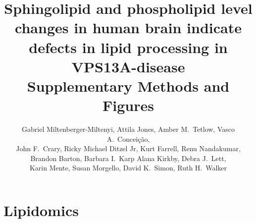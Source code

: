 \documentclass[letterpaper]{article}
\begin{document}
\title{Sphingolipid and phospholipid level changes in human brain indicate
defects in lipid processing in VPS13A-disease
	\\
{\large Supplementary Methods and Figures}}

\author{Gabriel Miltenberger-Miltenyi, Attila Jones, Amber M.~Tetlow,  Vasco A.~Conceição, 
\\
	John F.~Crary, Ricky Michael Ditzel Jr, Kurt Farrell, Renu Nandakumar,
\\
	Brandon Barton, Barbara I.~Karp  Alana Kirkby, Debra J.~Lett,
\\
	Karin Mente, Susan Morgello, David K.~Simon, Ruth H.~Walker}
\date{}
\maketitle

\renewcommand{\contentsname}{Supplementary Methods}
\tableofcontents
\renewcommand*\listfigurename{Supplementary Figures}
\listoffigures


\section{Lipidomics}
\end{document}
